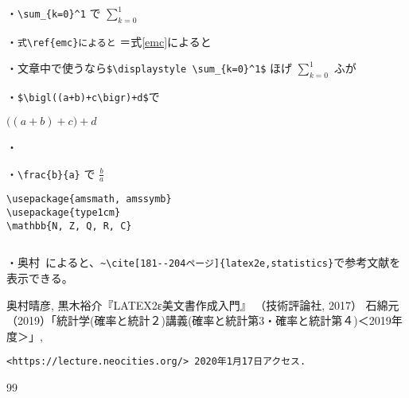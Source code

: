 \documentclass[a4paper,12pt,papersize,twocolumn,titlepage]{jsarticle}
\begin{document}
・\verb"\sum_{k=0}^1" で
$\sum_{k=0}^1$


・\verb"式\ref{emc}によると"
＝式\ref{emc}によると

・文章中で使うなら\verb"$\displaystyle \sum_{k=0}^1$"
ほげ $\displaystyle \sum_{k=0}^1$ ふが

・\verb"$\bigl((a+b)+c\bigr)+d$"で

$\bigl((a+b)+c\bigr)+d$

・\verb""


・\verb"\frac{b}{a}" で
$\frac{b}{a}$


\begin{verbatim}
\usepackage{amsmath, amssymb}
\usepackage{type1cm}
\mathbb{N, Z, Q, R, C}
\end{verbatim}

\begin{verbatim}

\end{verbatim}


・奥村~\cite[181--204ページ]{latex2e,statistics}によると、\verb"~\cite[181--204ページ]{latex2e,statistics}"で参考文献を表示できる。
\begin{thebibliography}{99}
  奥村晴彦, 黒木裕介『LATEX2ε美文書作成入門』
  （技術評論社, 2017）
  石綿元（2019）「統計学(確率と統計２)講義(確率と統計第3・確率と統計第４)＜2019年度＞」,
  \begin{verbatim}
<https://lecture.neocities.org/> 2020年1月17日アクセス.
\end{verbatim}
\end{thebibliography}{99}
\end{document}
